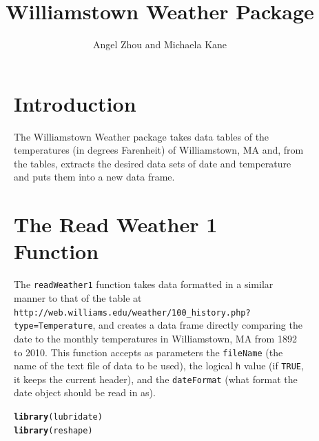 \documentclass{article}\usepackage{graphicx, color}
\makeatletter
\newcommand{\hlfunctioncall}[1]{\textcolor[rgb]{0.501960784313725,0,0.329411764705882}{\textbf{#1}}}%
\newenvironment{kframe}{%
 \def\at@end@of@kframe{}%
 \ifinner\ifhmode%
  \def\at@end@of@kframe{\end{minipage}}%
  \begin{minipage}{\columnwidth}%
 \fi\fi%
 \def\FrameCommand##1{\hskip\@totalleftmargin \hskip-\fboxsep
 \colorbox{shadecolor}{##1}\hskip-\fboxsep
     \hskip-\linewidth \hskip-\@totalleftmargin \hskip\columnwidth}%
 \MakeFramed {\advance\hsize-\width
   \@totalleftmargin\z@ \linewidth\hsize
   \@setminipage}}%
 {\par\unskip\endMakeFramed%
 \at@end@of@kframe}
\newenvironment{knitrout}{}{} %
\makeatother
\begin{document}
\title{Williamstown Weather Package}
\author{Angel Zhou and Michaela Kane}
\maketitle

\begin{figure}
\section*{Introduction}

The Williamstown Weather package takes data tables of the temperatures
(in degrees Farenheit) of Williamstown, MA and, from the tables,
extracts the desired data sets of date and temperature and puts them
into a new data frame.

\section*{The Read Weather 1 Function}
The \verb+readWeather1+ function takes data formatted in a similar
manner to that of the table at
\verb+http://web.williams.edu/weather/100_history.php?type=Temperature+,
and creates a data frame directly comparing the date to the monthly
temperatures in Williamstown, MA from 1892 to 2010. This function
accepts as parameters the \verb+fileName+ (the name of the text file
of data to be used), the logical \verb+h+ value (if \verb+TRUE+, it
keeps the current header), and the \verb+dateFormat+ (what format the
date object should be read in as).

\begin{knitrout}
\color{fgcolor}\begin{kframe}
\begin{alltt}
\hlfunctioncall{library}(lubridate)
\hlfunctioncall{library}(reshape)
\end{alltt}


{\ttfamily\noindent\itshape\color{messagecolor}{\#\# Loading required package: plyr}}

{\ttfamily\noindent\itshape\color{messagecolor}{\#\# \\\#\# Attaching package: 'plyr'}}

{\ttfamily\noindent\itshape\color{messagecolor}{\#\# The following object is masked from 'package:lubridate':\\\#\# \\\#\#\ \ \ \  here}}

{\ttfamily\noindent\itshape\color{messagecolor}{\#\# \\\#\# Attaching package: 'reshape'}}


\end{kframe}
\end{knitrout}
\end{figure}
\end{document}
